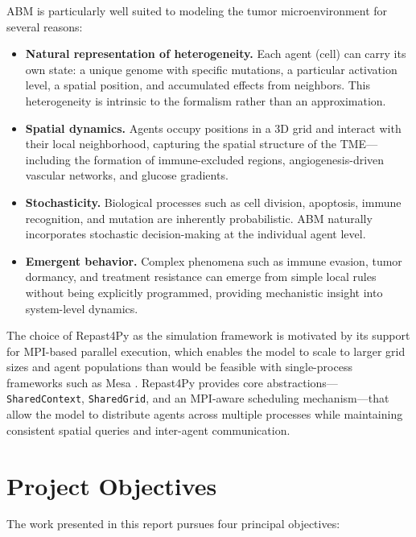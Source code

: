 ABM is particularly well suited to modeling the tumor microenvironment for several reasons:

\begin{itemize}[nosep]
    \item \textbf{Natural representation of heterogeneity.} Each agent (cell) can carry its own state: a unique genome with specific mutations, a particular activation level, a spatial position, and accumulated effects from neighbors. This heterogeneity is intrinsic to the formalism rather than an approximation.
    \item \textbf{Spatial dynamics.} Agents occupy positions in a 3D grid and interact with their local neighborhood, capturing the spatial structure of the TME---including the formation of immune-excluded regions, angiogenesis-driven vascular networks, and glucose gradients.
    \item \textbf{Stochasticity.} Biological processes such as cell division, apoptosis, immune recognition, and mutation are inherently probabilistic. ABM naturally incorporates stochastic decision-making at the individual agent level.
    \item \textbf{Emergent behavior.} Complex phenomena such as immune evasion, tumor dormancy, and treatment resistance can emerge from simple local rules without being explicitly programmed, providing mechanistic insight into system-level dynamics.
\end{itemize}

The choice of Repast4Py \cite{repast4py} as the simulation framework is motivated by its support for MPI-based parallel execution, which enables the model to scale to larger grid sizes and agent populations than would be feasible with single-process frameworks such as Mesa \cite{mesa}. Repast4Py provides core abstractions---\texttt{SharedContext}, \texttt{SharedGrid}, and an MPI-aware scheduling mechanism---that allow the model to distribute agents across multiple processes while maintaining consistent spatial queries and inter-agent communication.

\section{Project Objectives}
\label{sec:intro_objectives}

The work presented in this report pursues four principal objectives:

